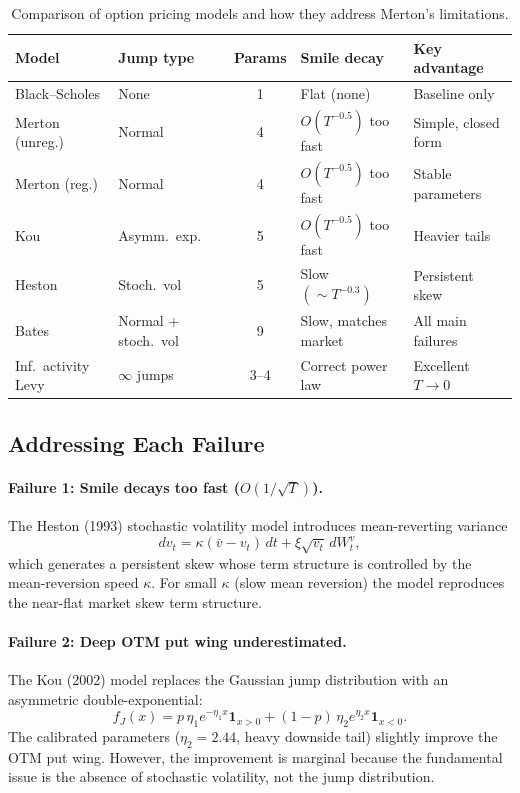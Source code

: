 \documentclass[12pt, a4paper]{article}
\begin{document}
\begin{table}[H]
\centering
\caption{Comparison of option pricing models and how they address
Merton's limitations.}
\label{tab:models}
\small
\begin{tabular}{p{3.0cm} p{2.2cm} c p{2.8cm} p{3.2cm}}
\toprule
\textbf{Model} & \textbf{Jump type} & \textbf{Params} &
\textbf{Smile decay} & \textbf{Key advantage} \\
\midrule
Black--Scholes      & None                 & 1   & Flat (none)             & Baseline only \\
Merton (unreg.)     & Normal               & 4   & $O(T^{-0.5})$ too fast  & Simple, closed form \\
Merton (reg.)       & Normal               & 4   & $O(T^{-0.5})$ too fast  & Stable parameters \\
Kou                 & Asymm.\ exp.         & 5   & $O(T^{-0.5})$ too fast  & Heavier tails \\
Heston              & Stoch.\ vol          & 5   & Slow $(\sim T^{-0.3})$  & Persistent skew \\
Bates               & Normal + stoch.\ vol & 9   & Slow, matches market    & All main failures \\
Inf.\ activity Levy & $\infty$ jumps       & 3--4 & Correct power law      & Excellent $T\!\to\!0$ \\
\bottomrule
\end{tabular}
\end{table}

\subsection{Addressing Each Failure}

\paragraph{Failure 1: Smile decays too fast ($O(1/\sqrt{T})$).}
The Heston (1993) stochastic volatility model introduces mean-reverting
variance
\[
    dv_t = \kappa(\bar{v}-v_t)\,dt + \xi\sqrt{v_t}\,dW_t^v,
\]
which generates a persistent skew whose term structure is controlled by the
mean-reversion speed $\kappa$. For small $\kappa$ (slow mean reversion) the
model reproduces the near-flat market skew term structure.

\paragraph{Failure 2: Deep OTM put wing underestimated.}
The Kou (2002) model replaces the Gaussian jump distribution with an
asymmetric double-exponential:
\[
    f_J(x) = p\,\eta_1 e^{-\eta_1 x}\mathbf{1}_{x>0}
            + (1-p)\,\eta_2 e^{\eta_2 x}\mathbf{1}_{x<0}.
\]
The calibrated parameters ($\eta_2 = 2.44$, heavy downside tail) slightly
improve the OTM put wing. However, the improvement is marginal because the
fundamental issue is the absence of stochastic volatility, not the jump
distribution.
\end{document}
